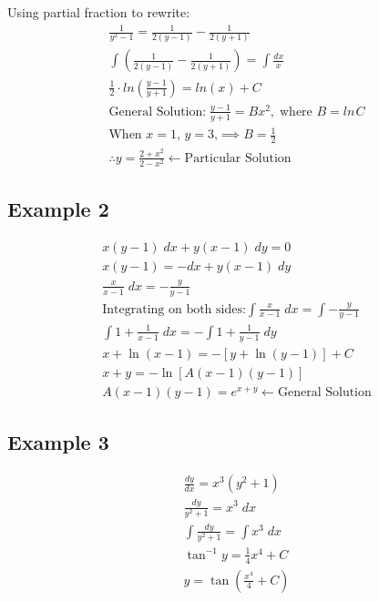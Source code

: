 \documentclass{article}
\begin{document}
\vspace{1ex}
Using partial fraction to rewrite:
\begin{gather*}
  \frac{1}{y^2 - 1} = \frac{1}{2(y - 1)} - \frac{1}{2(y + 1)} \\[6pt]
  \int (\frac{1}{2(y - 1)} - \frac{1}{2(y + 1)} ) = \int \frac{dx}{x} \\[6pt]
  \frac{1}{2} \cdot ln(\frac{y - 1}{y + 1}) = ln(x) + C \\[5pt]
  \text{General Solution:} \; \frac{y - 1}{y + 1} = Bx^2, \; 
  \text{where } B = ln \hspace{1pt} C \\[5pt]
  \text{When $x = 1$, $y = 3$,} \implies B = \frac{1}{2} \\[5pt]
  \therefore y = \frac{2 + x^2}{2 - x ^ 2} \leftarrow 
  \text{Particular Solution}
\end{gather*}

\subsection{Example 2}
\begin{gather*}
  x(y - 1) \; dx + y(x - 1) \; dy = 0 \\[5pt]
  x(y - 1) = -dx + y(x - 1) \; dy \\[5pt]
  \frac{x}{x - 1} \; dx = - \frac{y}{y - 1} \\[5pt]
  \text{Integrating on both sides:}
  \int \frac{x}{x - 1} \; dx = \int - \frac{y}{y - 1} \\[5pt]
  \int 1 + \frac{1}{x - 1} \; dx = - \int 1 + \frac{1}{y - 1} \; dy \\[5pt]
  x + \ln{(x - 1)} = -[y + \ln{(y - 1)}] + C \\[5pt]
  x + y = - \ln{[A(x-1)(y - 1)]} \\[5pt]
  A(x-1)(y-1) = e^{x+y} \leftarrow \text{General Solution}
\end{gather*}
 
\subsection{Example 3}
\begin{gather*}
  \frac{dy}{dx} = x^3(y^2 + 1) \\[5pt]
  \frac{dy}{y^2 + 1} = x^3 \; dx \\[5pt]
  \int \frac{dy}{y^2 + 1} = \int x^3 \; dx \\[5pt]
  \tan^{-1} y = \frac{1}{4} x^4 + C \\[5pt]
  y = \tan{(\frac{x^4}{4} + C)}
\end{gather*}
\end{document}
